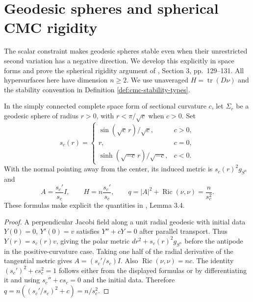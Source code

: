 \chapter{Geodesic spheres and spherical CMC rigidity}\label{sec:cmc-spaceforms}
The scalar constraint makes geodesic spheres stable even when their unrestricted second variation has a negative direction. We develop this explicitly in space forms and prove the spherical rigidity argument of \cite{BdCE88}, Section 3, pp.~129--131. All hypersurfaces here have dimension $n\geq2$. We use unaveraged $H=\operatorname{tr}(D\nu)$ and the stability convention in Definition \ref{def:cmc-stability-types}.

\begin{proposition}\label{prop:spaceform-sphere-geometry}
In the simply connected complete space form of sectional curvature $c$, let $\Sigma_r$ be a geodesic sphere of radius $r>0$, with $r<\pi/\sqrt c$ when $c>0$. Set
\[
 s_c(r)=\begin{cases}\sin(\sqrt c\,r)/\sqrt c,&c>0,\\ r,&c=0,\\ \sinh(\sqrt{-c}\,r)/\sqrt{-c},&c<0.\end{cases}
\]
With the normal pointing away from the center, its induced metric is $s_c(r)^2g_{S^n}$ and
\[
 A=\frac{s_c'}{s_c}I,\qquad H=n\frac{s_c'}{s_c},\qquad
 q=|A|^2+\operatorname{Ric}(\nu,\nu)=\frac n{s_c^2}.
\]
These formulas make explicit the quantities in \cite{BdCE88}, Lemma 3.4.
\end{proposition}
\begin{proof}
A perpendicular Jacobi field along a unit radial geodesic with initial data $Y(0)=0$, $Y'(0)=v$ satisfies $Y''+cY=0$ after parallel transport. Thus $Y(r)=s_c(r)v$, giving the polar metric $dr^2+s_c(r)^2g_{S^n}$ before the antipode in the positive-curvature case. Taking one half of the radial derivative of the tangential metric gives $A=(s_c'/s_c)I$. Also $\operatorname{Ric}(\nu,\nu)=nc$. The identity $(s_c')^2+cs_c^2=1$ follows either from the displayed formulas or by differentiating it and using $s_c''+cs_c=0$ and the initial data. Therefore $q=n((s_c'/s_c)^2+c)=n/s_c^2$.
\end{proof}

